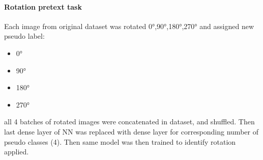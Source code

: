 \paragraph{Rotation pretext task}
Each image from original dataset was rotated 0°,90°,180°,270° and assigned new pseudo label:
\begin{itemize}
    \item 0° \textrightarrow {}
    \item 90° \textrightarrow {}
    \item 180° \textrightarrow {}
    \item 270° \textrightarrow {}
\end{itemize}
all 4 batches of rotated images were concatenated in dataset, and shuffled.
Then last dense layer of NN was replaced with dense layer for corresponding number of pseudo classes (4).
Then same model was then trained to identify rotation applied.
\\
